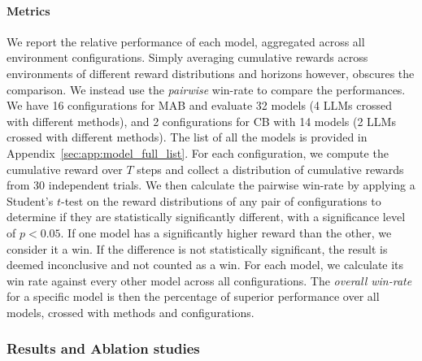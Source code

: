 \documentclass[11pt, logo]{googledeepmind}
\newcommand{\awr}{overall win-rate\xspace}
\theoremstyle{plain}
\theoremstyle{definition}
\begin{document}
\paragraph{Metrics}
We report the relative performance of each model, aggregated across all environment configurations. Simply averaging cumulative rewards across environments of different reward distributions and horizons however, obscures the comparison. We instead use the \emph{pairwise} win-rate to compare the performances. We have 16 configurations for MAB and evaluate 32 models (4 LLMs crossed with different methods), and 2 configurations for CB with 14 models (2 LLMs crossed with different methods).  The list of all the models is provided in Appendix~\ref{sec:app:model_full_list}. For each configuration, we compute the cumulative reward over
$T$ steps and collect a distribution of cumulative rewards from 30 independent trials. We then calculate the pairwise win-rate by applying a Student's $t$-test on the reward distributions of any pair of configurations to determine if they are statistically significantly different, with a significance level of $p<0.05$. If one model has a significantly higher reward than the other, we consider it a win. If the difference is not statistically significant, the result is deemed inconclusive and not counted as a win.
For each model, we calculate its win rate against every other model across all configurations. The \emph{\awr} for a specific model is then the percentage of superior performance over all models, crossed with methods and configurations.
\subsubsection{Results and Ablation studies}
\label{subsubsec: results}
\end{document}
